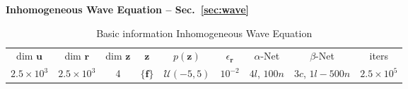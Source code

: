 \documentclass[11pt, fleqn]{article}
\def\z{{\mathbf z}}
\def\fbf{{\mathbf f}}
\def\ubf{{\mathbf u}}
\def\r{{\mathbf r}}
\begin{document}
\textbf{Inhomogeneous Wave Equation -- Sec.~\ref{sec:wave}}
\begin{table}[H]
\centering
\begin{tabular}{*{9}{c} }
    \toprule 
    dim $\ubf$ & dim $\r$   & dim $\z$ & $\z$ & $p(\z)$ & $\epsilon_\r$ & $\alpha$-Net & $\beta$-Net & iters\\
    $2.5\times 10^3$ & $2.5\times 10^3$ & 4 & $\{\fbf\}$ &  $\mathcal{U}(-5, 5)$ & $10^{-2}$  & $4l$, $100n$ & $3c$, $1l-500n$ &   $2.5\times 10^{5}$\\   
    \bottomrule
\end{tabular}
\caption{Basic information Inhomogeneous Wave Equation}
\end{table}
\end{document}
